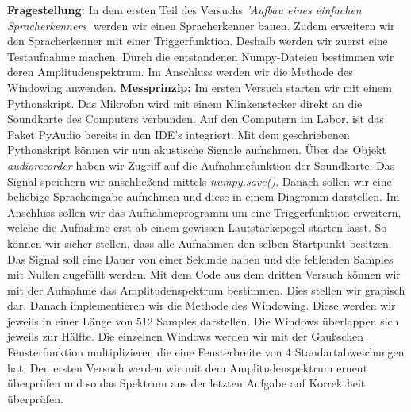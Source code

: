 \documentclass[12pt, oneside, a4paper, \docLanguage]{report}
\begin{document}
\textbf{Fragestellung:}
\newline
In dem ersten Teil des Versuchs \textit{'Aufbau eines einfachen Spracherkenners'} werden wir einen Spracherkenner bauen.
Zudem erweitern wir den Spracherkenner mit einer Triggerfunktion.
Deshalb werden wir zuerst eine Testaufnahme machen.
Durch die entstandenen Numpy-Dateien bestimmen wir deren Amplitudenspektrum.
Im Anschluss werden wir die Methode des Windowing anwenden.
\newline
\newline
\textbf{Messprinzip:}
\newline
Im ersten Versuch starten wir mit einem Pythonskript. Das Mikrofon wird mit einem Klinkenstecker direkt an die Soundkarte des Computers verbunden.
Auf den Computern im Labor, ist das Paket PyAudio bereits in den IDE's integriert.
\newline
Mit dem geschriebenen Pythonskript können wir nun akustische Signale aufnehmen. 
Über das Objekt \textit{audiorecorder} haben wir Zugriff auf die Aufnahmefunktion der Soundkarte.
\newline
Das Signal speichern wir anschließend mittels \textit{numpy.save()}.
Danach sollen wir eine beliebige Spracheingabe aufnehmen und diese in einem Diagramm darstellen.
\newline
\newline
Im Anschluss sollen wir das Aufnahmeprogramm um eine Triggerfunktion erweitern, welche die Aufnahme erst ab einem gewissen Lautstärkepegel starten lässt.
\newline
So können wir sicher stellen, dass alle Aufnahmen den selben Startpunkt besitzen.
\newpage
Das Signal soll eine Dauer von einer Sekunde haben und die fehlenden Samples mit Nullen augefüllt werden.
\newline
\newline
Mit dem Code aus dem dritten Versuch können wir mit der Aufnahme das Amplitudenspektrum bestimmen.
Dies stellen wir grapisch dar.
Danach implementieren wir die Methode des Windowing. 
\newline
Diese werden wir jeweils in einer Länge von 512 Samples darstellen. Die Windows überlappen sich jeweils zur Hälfte.
Die einzelnen Windows werden wir mit der Gaußschen Fensterfunktion multiplizieren  die eine Fensterbreite von 4 Standartabweichungen hat.
\newline
Den ersten Versuch werden wir mit dem Amplitudenspektrum erneut überprüfen und so das Spektrum aus der letzten Aufgabe auf Korrektheit überprüfen.
\newline
\end{document}
